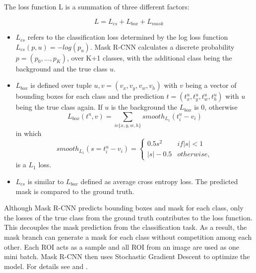 The loss function L is a summation of three different factors:

\begin{equation} \label{lossFunction}   L= L_{cs} + L_{box} + L_{mask} \end{equation}

 \begin{itemize}
    \item \textbf{ \( \label{Lcs}L_{cs}\)} refers to the classification loss determined by the log loss function \( L_{cs}(p,u) = -log(p_{u})\). Mask R-CNN calculates a discrete probability \(p = (p_{0},...,p_{K})\), over K+1 classes, with the additional class being the background and the true class $u$.
    
    \item \textbf{ \( \label{Lbox}L_{box}\)} is defined over tuple $u,v=(v_{x},v_{y},v_{w},v_{h})$ with $v$ being a vector of bounding boxes for each class and the prediction $t=(t^{u}_{x},t^{u}_{y},t^{u}_{w},t^{u}_{h})$ with $u$ being the true class again. If $u$ is the background the $L_{box}$ is 0, otherwise 
    \begin{equation}
        L_{box}(t^{u},v)= \sum_{i \epsilon  \{x,y,w,h\}} smooth_{L_{1}}(t^{u}_{i} - v_{i})
    \end{equation}
    in which
    \begin{equation}
        smooth_{L_{1}}( s= t^{u}_{i} - v_{i})= 
\left\{\begin{matrix}
 0.5s^2 & if|s |<1 \\ |s|-0.5 & otherwise,
\end{matrix}\right.
    \end{equation}
    is a $L_{1}$ loss.
    
    \item \textbf{ \( \label{Lmask}L_{cs}\)} is similar to $L_{box}$ defined as average cross entropy loss. The predicted mask is compared to the ground truth.
\end{itemize}

Although Mask R-CNN predicts bounding boxes and mask for each class, only the losses of the true class from the ground truth contributes to the loss function. This decouples the mask prediction from the classification task. As a result, the mask branch can generate a mask for each class without competition among each other.
Each ROI acts as a sample and all ROI from an image are used as one mini batch. Mask R-CNN then uses Stochastic Gradient Descent \cite{Kiefer.1952}  to optimize the model.
For details see  \cite{Girshick.30Apr15} and  \cite{He.op.2017}.